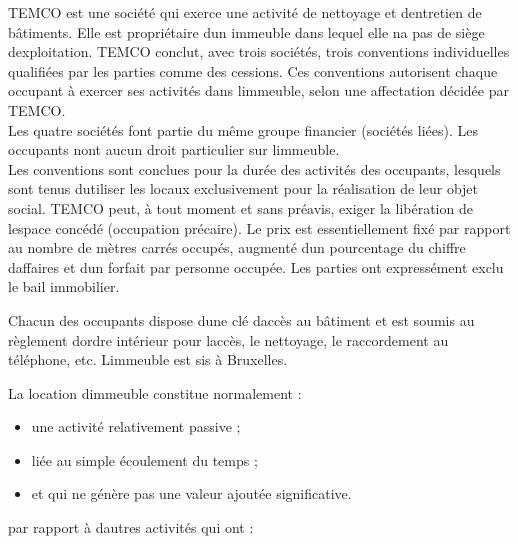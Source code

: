 \documentclass{book}
\begin{document}
TEMCO est une société qui exerce une activité de nettoyage et dentretien de bâtiments. Elle est propriétaire dun immeuble dans lequel elle na pas de siège dexploitation. TEMCO conclut, avec trois sociétés, trois conventions individuelles qualifiées par les parties comme des cessions. Ces conventions autorisent chaque occupant à exercer ses activités dans limmeuble, selon une affectation décidée par TEMCO.\\

Les quatre sociétés font partie du même groupe financier (sociétés liées). Les occupants nont aucun droit particulier sur limmeuble.\\ 

Les conventions sont conclues pour la durée des activités des occupants, lesquels sont tenus dutiliser les locaux exclusivement pour la réalisation de leur objet social. TEMCO peut, à tout moment et sans préavis, exiger la libération de lespace concédé (occupation précaire). Le prix est essentiellement fixé par rapport au nombre
de mètres carrés occupés, augmenté dun pourcentage du chiffre daffaires et dun forfait par personne occupée.
Les parties ont expressément exclu le bail immobilier.

Chacun des occupants dispose dune clé daccès au bâtiment et est soumis au règlement dordre intérieur pour laccès, le nettoyage, le raccordement au téléphone, etc. Limmeuble est sis à Bruxelles.

La location dimmeuble constitue normalement :
\begin{itemize}
\item une activité relativement passive ;
\item liée au simple écoulement du temps ;
\item et qui ne génère pas une valeur ajoutée significative.
\end{itemize}
\null
par rapport à dautres activités qui ont :\\
\end{document}
